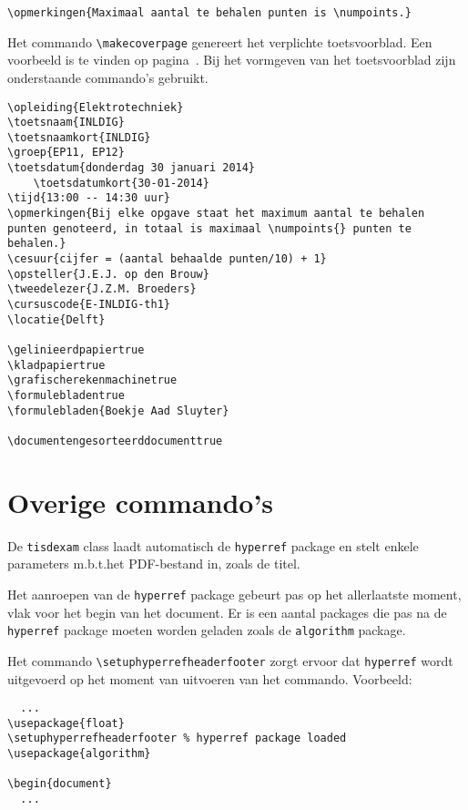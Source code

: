 \documentclass[dutch,a4paper,12pt,addpoints,fleqn,oneside]{tisdexam}
\newcommand\Package[1]{\texttt{#1}}
\newcommand\DocClass[1]{\texttt{#1}}
\begin{document}
\bigskip
\verb|\opmerkingen{Maximaal aantal te behalen punten is \numpoints.}|


\bigskip
Het commando \verb|\makecoverpage| genereert het verplichte toetsvoorblad.
Een voorbeeld is te vinden op pagina~\pageref{pag:coverpage}. Bij het vormgeven
van het toetsvoorblad zijn onderstaande commando's gebruikt.

\newpage
\begin{lstlisting}
\opleiding{Elektrotechniek}
\toetsnaam{INLDIG}
\toetsnaamkort{INLDIG}
\groep{EP11, EP12}
\toetsdatum{donderdag 30 januari 2014}
	\toetsdatumkort{30-01-2014}
\tijd{13:00 -- 14:30 uur}
\opmerkingen{Bij elke opgave staat het maximum aantal te behalen punten genoteerd, in totaal is maximaal \numpoints{} punten te behalen.}
\cesuur{cijfer = (aantal behaalde punten/10) + 1}
\opsteller{J.E.J. op den Brouw}
\tweedelezer{J.Z.M. Broeders}
\cursuscode{E-INLDIG-th1}
\locatie{Delft}

\gelinieerdpapiertrue
\kladpapiertrue
\grafischerekenmachinetrue
\formulebladentrue
\formulebladen{Boekje Aad Sluyter}

\documentengesorteerddocumenttrue
\end{lstlisting}

\section{Overige commando's}
\label{sec:overigecom}

De \DocClass{tisdexam} class laadt automatisch de \Package{hyperref} package
en stelt enkele parameters m.b.t.\@ het PDF-bestand in, zoals de titel.

Het aanroepen van de \Package{hyperref} package gebeurt pas op het allerlaatste
moment, vlak voor het begin van het document. Er is een aantal packages die
pas na de \Package{hyperref} package moeten worden geladen zoals de \Package{algorithm}
package.

Het commando \verb|\setuphyperrefheaderfooter| zorgt ervoor dat \Package{hyperref}
wordt uitgevoerd op het moment van uitvoeren van het commando. Voorbeeld:

\begin{lstlisting}
  ...
\usepackage{float}
\setuphyperrefheaderfooter % hyperref package loaded
\usepackage{algorithm}

\begin{document}
  ...
\end{lstlisting}
\end{document}
